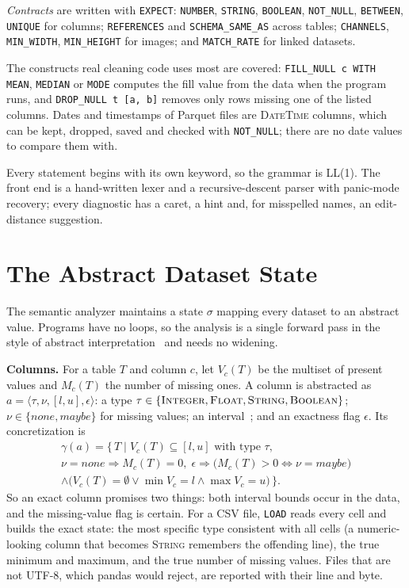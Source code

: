 \documentclass[conference]{IEEEtran}
\begin{document}
\emph{Contracts} are written with \texttt{EXPECT}: \texttt{NUMBER}, \texttt{STRING},
\texttt{BOOLEAN}, \texttt{NOT\_NULL}, \texttt{BETWEEN}, \texttt{UNIQUE} for columns;
\texttt{REFERENCES} and \texttt{SCHEMA\_SAME\_AS} across tables; \texttt{CHANNELS},
\texttt{MIN\_WIDTH}, \texttt{MIN\_HEIGHT} for images; and \texttt{MATCH\_RATE} for linked datasets.

The constructs real cleaning code uses most are covered: \texttt{FILL\_NULL c WITH MEAN},
\texttt{MEDIAN} or \texttt{MODE} computes the fill value from the data when the program runs, and
\texttt{DROP\_NULL t [a, b]} removes only rows missing one of the listed columns. Dates and
timestamps of Parquet files are \textsc{DateTime} columns, which can be kept, dropped, saved and
checked with \texttt{NOT\_NULL}; there are no date values to compare them with.

Every statement begins with its own keyword, so the grammar is LL(1). The front end is a
hand-written lexer and a recursive-descent parser with panic-mode recovery; every diagnostic has a
caret, a hint and, for misspelled names, an edit-distance suggestion.

\section{The Abstract Dataset State}\label{sec:state}

The semantic analyzer maintains a state $\sigma$ mapping every dataset to an abstract value.
Programs have no loops, so the analysis is a single forward pass in the style of abstract
interpretation~\cite{cousot1977} and needs no widening.

\textbf{Columns.} For a table $T$ and column $c$, let $V_c(T)$ be the multiset of present values
and $M_c(T)$ the number of missing ones. A column is abstracted as
$a = \langle \tau, \nu, [l,u], \epsilon \rangle$: a type
$\tau \in \{\textsc{Integer}, \textsc{Float}, \textsc{String}, \textsc{Boolean}\}$; $\nu \in
\{\textit{none}, \textit{maybe}\}$ for missing values; an interval~\cite{cousot1976}; and an
exactness flag $\epsilon$. Its concretization is
\begin{multline*}
\gamma(a) = \{\, T \mid V_c(T) \subseteq [l,u] \text{ with type } \tau, \\
  \nu = \textit{none} \Rightarrow M_c(T) = 0,\;
  \epsilon \Rightarrow \big(M_c(T) > 0 \Leftrightarrow \nu = \textit{maybe}\big) \\
  \wedge \big(V_c(T) = \emptyset \vee \min V_c = l \wedge \max V_c = u\big) \,\}.
\end{multline*}
So an exact column promises two things: both interval bounds occur in the data, and the
missing-value flag is certain. For a CSV file, \texttt{LOAD} reads every cell and builds the
exact state: the most specific type consistent with all cells (a numeric-looking column that
becomes \textsc{String} remembers the offending line), the true minimum and maximum, and the true
number of missing values. Files that are not UTF-8, which pandas would reject, are reported with
their line and byte.
\end{document}

